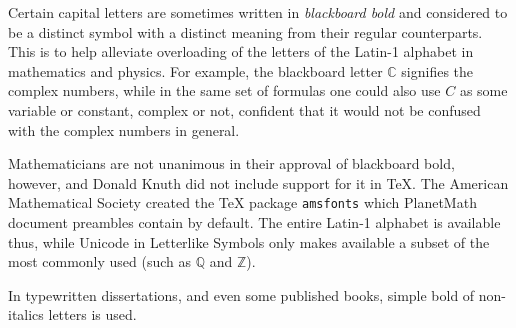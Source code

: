 \documentclass[12pt]{article}
\begin{document}
Certain capital letters are sometimes written in {\em blackboard bold} and considered to be a distinct symbol with a distinct meaning from their regular counterparts. This is to help alleviate overloading of the letters of the Latin-1 alphabet in mathematics and physics. For example, the blackboard letter $\mathbb{C}$ signifies the complex numbers, while in the same set of formulas one could also use $C$ as some variable or constant, complex or not, confident that it would not be confused with the complex numbers in general.

Mathematicians are not unanimous in their approval of blackboard bold, however, and Donald Knuth did not include support for it in \TeX{}. The American Mathematical Society created the \TeX{} package \verb=amsfonts= which PlanetMath document preambles contain by default. The entire Latin-1 alphabet is available thus, while Unicode in Letterlike Symbols only makes available a subset of the most commonly used (such as $\mathbb{Q}$ and $\mathbb{Z}$).

In typewritten dissertations, and even some published books, simple bold of non-italics letters is used.

\end{document}
